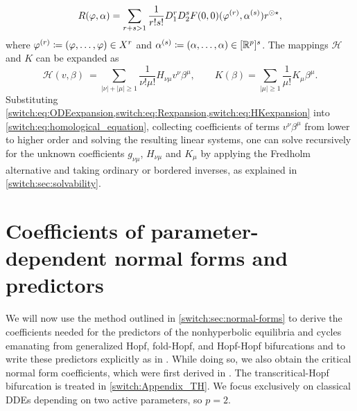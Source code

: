 \begin{equation}
  \label{switch:eq:Rexpansion}
  R(\varphi,\alpha)=\sum_{r + s > 1}\frac{1}{r!s!}D_1^rD_2^sF(0,0)(\varphi^{(r)},\alpha^{(s)})r^{\odot\star},
\end{equation}
where $\varphi^{(r)} \coloneqq (\varphi,\dots,\varphi)\in X^r$ and $\alpha^{(s)} \coloneqq (\alpha,\dots,\alpha)\in [\mathbb{R}^p]^s$. The mappings $\mathcal{H}$ and $K$ can be expanded as
\begin{equation}
  \label{switch:eq:HKexpansion}
\mathcal{H}(v,\beta)\ =\sum_{|\nu|+|\mu| \geq 1}\dfrac{1}{\nu!\mu!}H_{\nu\mu}v^{\nu}\beta^{\mu}, \qquad K(\beta)=\sum_{|\mu| \geq 1}\dfrac{1}{\mu!}K_{\mu}\beta^{\mu}.
\end{equation}
Substituting \cref{switch:eq:ODEexpansion,switch:eq:Rexpansion,switch:eq:HKexpansion} into \cref{switch:eq:homological_equation}, collecting coefficients of terms $v^{\nu}\beta^{\mu}$ from lower to higher order and solving the resulting linear systems, one can solve recursively for the unknown coefficients $g_{\nu\mu}$, $H_{\nu\mu}$ and $K_{\mu}$ by applying the Fredholm alternative and taking ordinary or bordered inverses, as explained in \cref{switch:sec:solvability}.

\section{Coefficients of parameter-dependent normal forms and predictors\label{switch:sec:Coefficients-of-parameter}}
We will now use the method outlined in \cref{switch:sec:normal-forms} to derive the coefficients needed for the predictors of the nonhyperbolic equilibria and cycles emanating from generalized Hopf, fold-Hopf, and Hopf-Hopf bifurcations and to write these predictors explicitly as in \cite{Kuznetsov2008}. While doing so, we also obtain the critical normal form coefficients, which were first derived in \cite{Janssens:Thesis}. The transcritical-Hopf bifurcation is treated in \cref{switch:Appendix_TH}. We focus exclusively on classical DDEs depending on two active parameters, so $p=2$.

